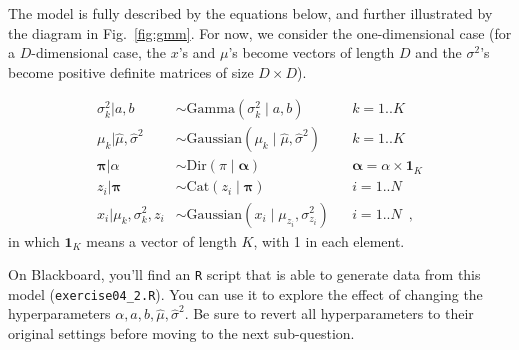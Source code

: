 \documentclass[a4paper]{article}
\renewcommand{\v}[1]{\mathbf{\bm #1}}
\begin{document}
The model is fully described by the equations below, and further illustrated by the diagram in Fig.~\ref{fig:gmm}. For now, we consider the one-dimensional case (for a $D$-dimensional case, the $x$'s and $\mu$'s become vectors of length $D$ and the $\sigma^2$'s become positive definite matrices of size $D\times D$).

\begin{align*}
    \sigma^2_k | a, b               &\sim \mathrm{Gamma}\left( \sigma^2_k \mid a, b \right) && k=1..K \\
    \mu_k | \hat{\mu}, \hat{\sigma}^2 &\sim \mathrm{Gaussian}\left( \mu_k \mid \hat{\mu}, \hat{\sigma}^2 \right)  && k=1..K\\
    \v{\pi} | \alpha                &\sim \mathrm{Dir}\left( \pi \mid \v{\alpha} \right) && \v{\alpha}=\alpha \times \v{1}_K\\
    z_i | \v{\pi}                   &\sim \mathrm{Cat}\left( z_i \mid \v{\pi}\right) && i=1..N\\
    x_i | \mu_k, \sigma^2_k, z_i    &\sim \mathrm{Gaussian}\left(x_i \mid \mu_{z_i}, \sigma^2_{z_i} \right) && i=1..N \enspace,
\end{align*} in which $\v{1}_K$ means a vector of length $K$, with 1 in each element.

On Blackboard, you'll find an \texttt{R} script that is able to generate data from this model (\texttt{exercise04\_2.R}). You can use it to explore the effect of changing the hyperparameters $\alpha, a, b, \hat{\mu}, \hat{\sigma}^2$. Be sure to revert all hyperparameters to their original settings before moving to the next sub-question.
\end{document}
